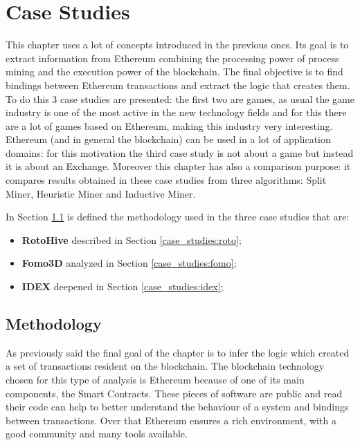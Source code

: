 \chapter{Case Studies}
\label{case_studies}

This chapter uses a lot of concepts introduced in the previous ones. Its goal is to extract information from Ethereum combining 
the processing power of process mining and the execution power of the blockchain. The final objective is to find bindings 
between Ethereum transactions and extract the logic that creates them. To do this 3 case studies are presented: the first two 
are games, as usual the game industry is one of the most active in the new technology fields and for this there are a lot of 
games based on Ethereum, making this industry very interesting. Ethereum (and in general the blockchain) can be used in a lot 
of application domains: for this motivation the third case study is not about a game but instead it is about an Exchange.
Moreover this chapter has also a comparison purpose: it compares results obtained in these case studies from three algorithms: 
Split Miner, Heuristic Miner and Inductive Miner.

In Section \ref{case_studies:methodology} is defined the methodology used in the three case studies that are: 
\begin{itemize}
    \item \textbf{RotoHive} described in Section \ref{case_studies:roto};
    \item \textbf{Fomo3D} analyzed in Section \ref{case_studies:fomo};
    \item \textbf{IDEX} deepened in Section \ref{case_studies:idex};
\end{itemize}


\section{Methodology}
\label{case_studies:methodology}

As previously said the final goal of the chapter is to infer the logic which created a set of transactions resident on the 
blockchain. The blockchain technology chosen for this type of analysis is Ethereum because of one of its main components, 
the Smart Contracts. These pieces of software are public and read their code can help to better understand the behaviour of 
a system and bindings between transactions. Over that Ethereum ensures a rich environment, with a good community and many 
tools available.


